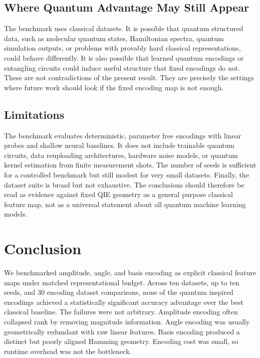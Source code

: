 \documentclass[12pt]{article}
\begin{document}
\subsection{Where Quantum Advantage May Still Appear}

The benchmark uses classical datasets. It is possible that quantum structured
data, such as molecular quantum states, Hamiltonian spectra, quantum simulation
outputs, or problems with provably hard classical representations, could behave
differently. It is also possible that learned quantum encodings or entangling
circuits could induce useful structure that fixed encodings do not. These are
not contradictions of the present result. They are precisely the settings where
future work should look if the fixed encoding map is not enough.

\subsection{Limitations}

The benchmark evaluates deterministic, parameter free encodings with linear
probes and shallow neural baselines. It does not include trainable quantum
circuits, data reuploading architectures, hardware noise models, or quantum
kernel estimation from finite measurement shots. The number of seeds is
sufficient for a controlled benchmark but still modest for very small datasets.
Finally, the dataset suite is broad but not exhaustive. The conclusions should
therefore be read as evidence against fixed QIE geometry as a general purpose
classical feature map, not as a universal statement about all quantum machine
learning models.

\section{Conclusion}
\label{sec:conclusion}

We benchmarked amplitude, angle, and basis encoding as explicit classical
feature maps under matched representational budget. Across ten datasets, up to ten
seeds, and 30 encoding dataset comparisons, none of the quantum inspired
encodings achieved a statistically significant accuracy advantage over the best
classical baseline. The failures were not arbitrary. Amplitude encoding often
collapsed rank by removing magnitude information. Angle encoding was usually
geometrically redundant with raw linear features. Basis encoding produced a
distinct but poorly aligned Hamming geometry. Encoding cost was small, so runtime
overhead was not the bottleneck.
\end{document}
